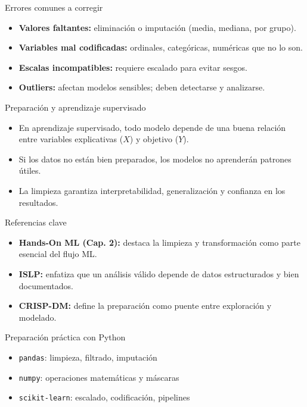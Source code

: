 \documentclass{beamer}
\begin{document}
\begin{frame}{Errores comunes a corregir}
\begin{itemize}
    \item \textbf{Valores faltantes:} eliminación o imputación (media, mediana, por grupo).
    \item \textbf{Variables mal codificadas:} ordinales, categóricas, numéricas que no lo son.
    \item \textbf{Escalas incompatibles:} requiere escalado para evitar sesgos.
    \item \textbf{Outliers:} afectan modelos sensibles; deben detectarse y analizarse.
\end{itemize}
\end{frame}

\begin{frame}{Preparación y aprendizaje supervisado}
\begin{itemize}
    \item En aprendizaje supervisado, todo modelo depende de una buena relación entre variables explicativas ($X$) y objetivo ($Y$).
    \item Si los datos no están bien preparados, los modelos no aprenderán patrones útiles.
    \item La limpieza garantiza interpretabilidad, generalización y confianza en los resultados.
\end{itemize}
\end{frame}

\begin{frame}{Referencias clave}
\begin{itemize}
    \item \textbf{Hands-On ML (Cap. 2):} destaca la limpieza y transformación como parte esencial del flujo ML.
    \item \textbf{ISLP:} enfatiza que un análisis válido depende de datos estructurados y bien documentados.
    \item \textbf{CRISP-DM:} define la preparación como puente entre exploración y modelado.
\end{itemize}
\end{frame}

\begin{frame}{Preparación práctica con Python}
\begin{itemize}
    \item \texttt{pandas}: limpieza, filtrado, imputación
    \item \texttt{numpy}: operaciones matemáticas y máscaras
    \item \texttt{scikit-learn}: escalado, codificación, pipelines
\end{itemize}
\end{frame}
\end{document}
